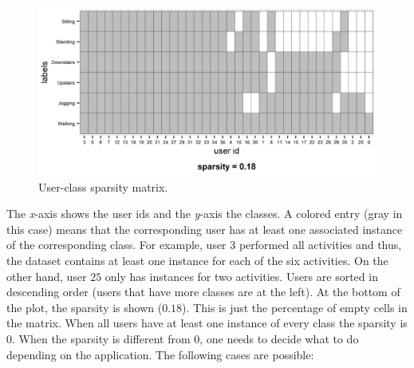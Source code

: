 \documentclass[
  11pt,
]{krantz}
\begin{document}
\begin{figure}

{\centering \includegraphics[width=1\linewidth]{images/sparsitymatrix} 

}

\caption{User-class sparsity matrix.}\label{fig:sparsityMatrix}
\end{figure}

The \emph{x}-axis shows the user ids and the \emph{y}-axis the classes. A colored entry (gray in this case) means that the corresponding user has at least one associated instance of the corresponding class. For example, user \(3\) performed all activities and thus, the dataset contains at least one instance for each of the six activities. On the other hand, user \(25\) only has instances for two activities. Users are sorted in descending order (users that have more classes are at the left). At the bottom of the plot, the sparsity is shown (\(0.18\)). This is just the percentage of empty cells in the matrix. When all users have at least one instance of every class the sparsity is \(0\). When the sparsity is different from \(0\), one needs to decide what to do depending on the application. The following cases are possible:
\end{document}
